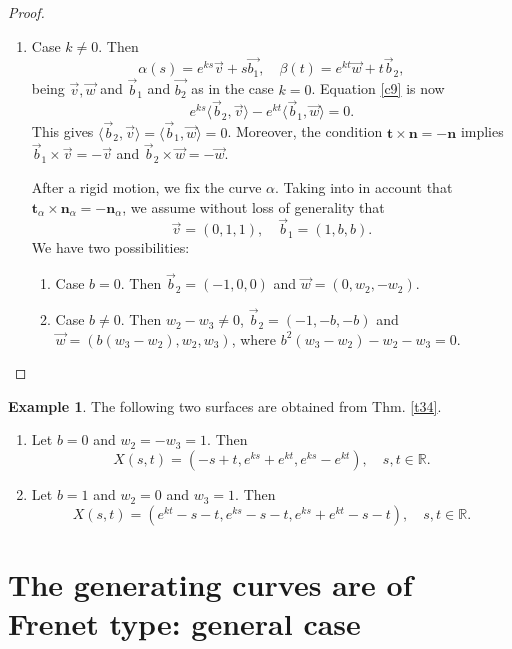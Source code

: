 \documentclass[a4paper,12pt]{amsart}
\numberwithin{equation}{section}
\theoremstyle{definition}
\newtheorem{example}[theorem]{Example}
\def\r{\mathbb R}
\def\r{\mathbb R}
\def\t{\mathbf t}
\def\n{\mathbf n}
\begin{document}
\begin{proof}
\begin{enumerate}
\begin{enumerate}
$$\langle\vec{v},\vec{w}\rangle s-\langle\vec{v},\vec{w}\rangle t+\langle \vec{b}_1,\vec{w}\rangle-\langle\vec{b}_2,\vec{v}\rangle=0.$$
This proves that $\langle\vec{v},\vec{w}\rangle=0$ and because  both vectors are lightlike, they must be proportional, $\vec{w}=\lambda\vec{v}$. Then it is immediate $\langle X(s,t),\vec{v}\rangle=0$ for all $s,t$. This proves that $M$ is contained in a plane.
\item Case $k\not=0$. Then
$$\alpha(s)=e^{ks}\vec{v}+s\vec{b_1},\quad \beta(t)=e^{kt}\vec{w}+t\vec{b}_2,$$
being $\vec{v}, \vec{w}$ and $\vec{b}_1$ and $\vec{b_2}$ as in the case $k=0$. Equation \eqref{c9} is now
$$e^{ks}\langle\vec{b}_2,\vec{v}\rangle-e^{kt}\langle \vec{b}_1,\vec{w}\rangle=0.$$
This gives $\langle\vec{b}_2,\vec{v}\rangle=\langle \vec{b}_1,\vec{w}\rangle=0$. Moreover,   the condition 
  $\t\times\n =-\n $  implies $\vec{b}_1\times\vec{v}=-\vec{v}$ and $\vec{b}_2\times\vec{w}=-\vec{w}$.

After a rigid motion, we   fix the curve $\alpha$. Taking into in account that $\t_\alpha\times\n_\alpha=-\n_\alpha$, we assume without loss of generality that
$$\vec{v}=(0,1,1),\quad \vec{b}_1=(1,b,b).$$
We have two possibilities:
\begin{enumerate}
\item Case $b=0$. Then $\vec{b}_2=(-1,0,0)$ and $\vec{w}=(0,w_2,-w_2)$.
\item Case $b\not=0$. Then  $w_2-w_3\not=0$, $\vec{b}_2=(-1,-b,-b)$ and $\vec{w}=(b(w_3-w_2),w_2,w_3)$, where  $b^2(w_3-w_2)-w_2-w_3=0$.
\end{enumerate}
\end{enumerate}
\end{enumerate}
\end{proof}

\begin{example} The following two surfaces are obtained from Thm. \ref{t34}. 
\begin{enumerate}
\item Let $b=0$ and $w_2=-w_3=1$. Then 
$$X(s,t)=(-s+t,e^{ks}+e^{kt},e^{ks}-e^{kt}),\quad s,t\in\r.$$
\item Let $b=1$ and $w_2=0$ and $w_3=1$. Then 
$$X(s,t)=( e^{kt}-s-t, e^{ks}-s-t, e^{ks}+e^{kt}-s-t),\quad s,t\in\r.$$
\end{enumerate}

\end{example}


 
 \section{The generating curves are of Frenet type: general case}\label{s4}
 
\end{document}
